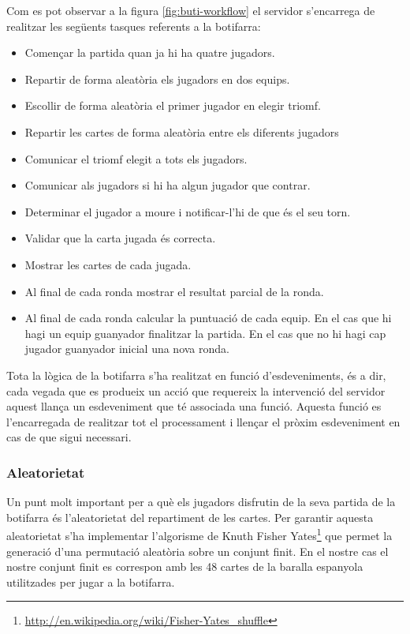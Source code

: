 \newpage

Com es pot observar a la figura \ref{fig:buti-workflow} el servidor s'encarrega de realitzar les següents tasques referents a la botifarra: 

\begin{itemize}
\item{Començar la partida quan ja hi ha quatre jugadors. }
\item{Repartir de forma aleatòria els jugadors en dos equips. }
\item{Escollir de forma aleatòria el primer jugador en elegir triomf.}
\item{Repartir les cartes de forma aleatòria entre els diferents jugadors}
\item{Comunicar el triomf elegit a tots els jugadors.}
\item{Comunicar als jugadors si hi ha algun jugador que contrar.}
\item{Determinar el jugador a moure i notificar-l'hi de que és el seu torn.}
\item{Validar que la carta jugada és correcta.}
\item{Mostrar les cartes de cada jugada.}
\item{Al final de cada ronda mostrar el resultat parcial de la ronda. }
\item{Al final de cada ronda calcular la puntuació de cada equip. En el cas que hi hagi un equip guanyador finalitzar la partida. En el cas que no hi hagi cap jugador guanyador inicial una nova ronda.}
\end{itemize}

Tota la lògica de la botifarra s'ha realitzat en funció d'esdeveniments, és a dir, cada vegada que es produeix un acció que requereix la intervenció del servidor aquest llança un esdeveniment que té associada una funció. Aquesta funció es l'encarregada de realitzar tot el processament i llençar el pròxim esdeveniment en cas de que sigui necessari.  


\subsubsection{Aleatorietat}

Un punt molt important per a què els jugadors disfrutin de la seva partida de la botifarra és l'aleatorietat del repartiment de les cartes. Per garantir aquesta aleatorietat s'ha implementar l'algorisme de Knuth Fisher Yates\footnote{\url{http://en.wikipedia.org/wiki/Fisher-Yates_shuffle}} que permet la generació d'una permutació aleatòria sobre un conjunt finit. En el nostre cas el nostre conjunt finit es correspon amb les 48 cartes de la baralla espanyola utilitzades per jugar a la botifarra. 


